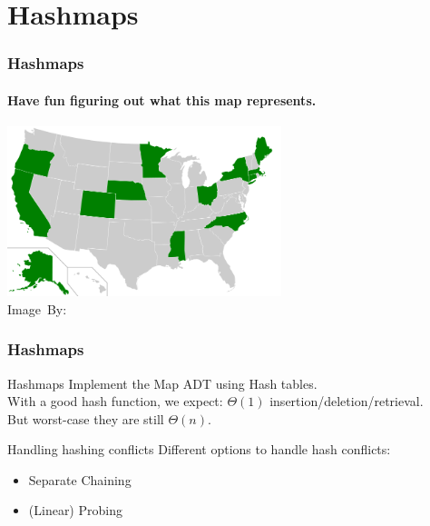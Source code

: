 \section{Hashmaps}%
\label{sec:hashmaps}

\begin{frame}
	\frametitle{Hashmaps}
	\framesubtitle{Have fun figuring out what this map represents.}
	\begin{center}
		\includegraphics[width=0.6\textwidth]{figures/hashmap.png}\\
		\hspace*{15pt}\hbox{\scriptsize Image By:}
	\end{center}
\end{frame}

\begin{frame}
	\frametitle{Hashmaps}
		\begin{block}{Hashmaps}
			Implement the Map ADT using Hash tables.\\
			\pause
			With a good hash function, we expect: $\Theta(1)$ insertion/deletion/retrieval.\\
			But worst-case they are still $\Theta(n)$.
		\end{block}	
		\pause
		\begin{problemblock}{Handling hashing conflicts}
			Different options to handle hash conflicts:
			\begin{itemize}
				\item Separate Chaining
				\item (Linear) Probing
			\end{itemize}
		\end{problemblock}
\end{frame}

